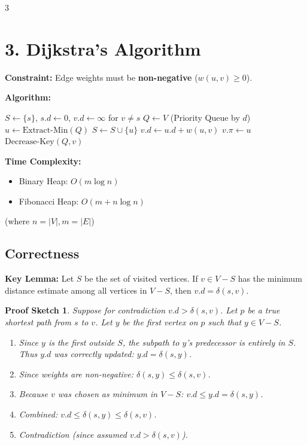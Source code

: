 \documentclass[10pt, a4paper, landscape]{article}
\newtheorem*{proof_sketch}{Proof Sketch}
\begin{document}
\begin{multicols}{3}
\section*{3. Dijkstra's Algorithm}
\textbf{Constraint:} Edge weights must be \textbf{non-negative} ($w(u,v) \ge 0$).

\textbf{Algorithm:}
\begin{algorithmic}[1]
\State $S \gets \{s\}$, $s.d \gets 0$, $v.d \gets \infty$ for $v \neq s$
\State $Q \gets V$ (Priority Queue by $d$)
    \State $u \gets \text{Extract-Min}(Q)$
    \State $S \gets S \cup \{u\}$
            \State $v.d \gets u.d + w(u,v)$ 
            \State $v.\pi \gets u$
            \State $\text{Decrease-Key}(Q, v)$
        \EndIf
    \EndFor
\EndWhile
\end{algorithmic}

\textbf{Time Complexity:}
\begin{itemize}[leftmargin=*]
    \item Binary Heap: $O(m \log n)$
    \item Fibonacci Heap: $O(m + n \log n)$
\end{itemize}
(where $n=|V|, m=|E|$)

\subsection*{Correctness}
\textbf{Key Lemma:} Let $S$ be the set of visited vertices. If $v \in V-S$ has the minimum distance estimate among all vertices in $V-S$, then $v.d = \delta(s, v)$.

\begin{proof_sketch}
Suppose for contradiction $v.d > \delta(s, v)$. Let $p$ be a true shortest path from $s$ to $v$. Let $y$ be the first vertex on $p$ such that $y \in V-S$.
\begin{enumerate}[leftmargin=*]
    \item Since $y$ is the first outside $S$, the subpath to $y$'s predecessor is entirely in $S$. Thus $y.d$ was correctly updated: $y.d = \delta(s, y)$.
    \item Since weights are non-negative: $\delta(s, y) \le \delta(s, v)$.
    \item Because $v$ was chosen as minimum in $V-S$: $v.d \le y.d = \delta(s, y)$.
    \item Combined: $v.d \le \delta(s, y) \le \delta(s, v)$.
    \item Contradiction (since assumed $v.d > \delta(s, v)$).
\end{enumerate}
\end{proof_sketch}


\end{multicols}
\end{document}

